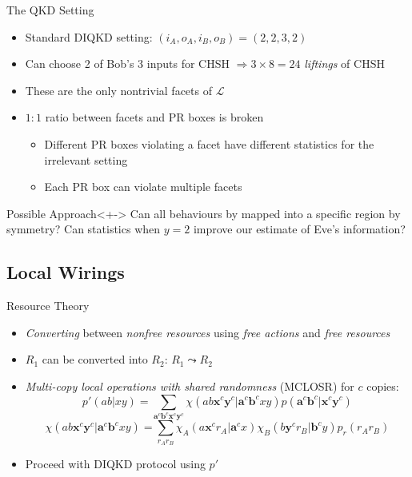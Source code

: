 \documentclass[xcolor=dvipsnames]{beamer}
\newcommand{\?}{\mathrel{?}} %
\newcommand{\cvec}[1]{\boldsymbol{\mathbf{#1}}}    %
\newcommand{\Ls}{\mathcal{L}}
\begin{document}
\begin{frame}{The QKD Setting}
  \begin{itemize}[<+->]
    \item Standard DIQKD setting: \((i_A, o_A, i_B, o_B) = (2,2,3,2)\)
    \item Can choose 2 of Bob's 3 inputs for CHSH \(\Rightarrow 3 \times 8 = 24\) \emph{liftings} of CHSH
    \item These are the only nontrivial facets of \(\Ls\)
    \item \(1 : 1\) ratio between facets and PR boxes is broken
      \begin{itemize}
        \item Different PR boxes violating a facet have different statistics for the irrelevant setting
        \item Each PR box can violate multiple facets
      \end{itemize}
  \end{itemize}
  \begin{block}{Possible Approach}<+->
    Can all behaviours by mapped into a specific region by symmetry? Can statistics when \(y=2\) improve our estimate of Eve's information?
  \end{block}
\end{frame}



\subsection{Local Wirings}

\begin{frame}{Resource Theory}
  \begin{itemize}[<+->]
    \item \emph{Converting} between \emph{nonfree resources} using \emph{free actions} and \emph{free resources}
    \item \(R_1\) can be converted into \(R_2\): \(R_1 \leadsto R_2\)
    \item \emph{Multi-copy local operations with shared randomness} (MCLOSR) for \(c\) copies:
      \[ p'(ab|xy) = \sum_{\cvec{a}^c\cvec{b}^c\cvec{x}^c\cvec{y}^c} \chi(ab\cvec{x}^c\cvec{y}^c|\cvec{a}^c\cvec{b}^cxy) p(\cvec{a}^c\cvec{b}^c|\cvec{x}^c\cvec{y}^c) \]
      \[ \chi(ab\cvec{x}^c\cvec{y}^c|\cvec{a}^c\cvec{b}^cxy) = \sum_{r_A r_B} \chi_A(a\cvec{x}^c r_A|\cvec{a}^cx) \chi_B(b\cvec{y}^c r_B|\cvec{b}^cy) p_r(r_A r_B) \]
    \item Proceed with DIQKD protocol using \(p'\)
  \end{itemize}
\end{frame}
\end{document}
